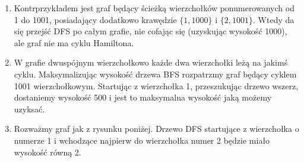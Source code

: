 \begin{solutions}
    \begin{enumerate}[\bf A.]
        \item Kontrprzykładem jest graf będący ścieżką wierzchołków ponumerowanych od 1 do 1001, posiadający dodatkowo krawędzie $\{1, 1000\}$ i $\{2, 1001\}$. Wtedy da się przejść DFS po całym grafie, nie cofając się (uzyskując wysokość 1000), ale graf nie ma cyklu Hamiltona.

        \item W grafie dwuspójnym wierzchołkowo każde dwa wierzchołki leżą na jakimś cyklu. Maksymalizując wysokość drzewa BFS rozpatrzmy graf będący cyklem 1001 wierzchołkowym. Startując z wierzchołka 1, przeszukując drzewo wszerz, dostaniemy wysokość 500 i jest to maksymalna wysokość jaką możemy uzyksać.

        \item Rozważmy graf jak z rysunku poniżej. Drzewo DFS startujące z wierzchołka o numerze 1 i wchodzące najpierw do wierzchołka numer 2 będzie miało wysokość równą 2.

        \begin{center}
        \end{center}
    \end{enumerate}


\end{solutions}
